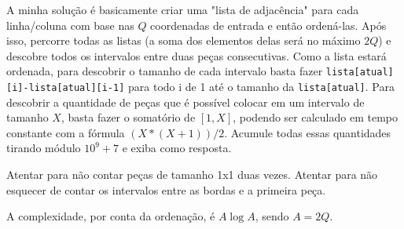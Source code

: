 A minha solução é basicamente criar uma "lista de adjacência" para cada linha/coluna com base nas $Q$ coordenadas de entrada e então ordená-las.
Após isso, percorre todas as listas (a soma dos elementos delas será no máximo $2Q$) e descobre todos os intervalos entre duas peças consecutivas.
Como a lista estará ordenada, para descobrir o tamanho de cada intervalo basta fazer \texttt{lista[atual][i]-lista[atual][i-1]} para todo i de 1 até o tamanho da \texttt{lista[atual]}.
Para descobrir a quantidade de peças que é possível colocar em um intervalo de tamanho $X$, basta fazer o somatório de $[1, X]$, podendo ser calculado em tempo constante com a fórmula
$(X*(X+1))/2$. Acumule todas essas quantidades tirando módulo $10^9+7$ e exiba como resposta.

Atentar para não contar peças de tamanho 1x1 duas vezes.
Atentar para não esquecer de contar os intervalos entre as bordas e a primeira peça.


A complexidade, por conta da ordenação, é $A \log A$, sendo $A = 2Q$.
